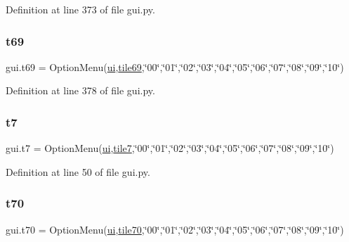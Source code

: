 Definition at line 373 of file gui.\+py.

\mbox{\label{namespacegui_ae401d95cbad2f858265141e0d3b06254}} 
\subsubsection{\texorpdfstring{t69}{t69}}
{\footnotesize\ttfamily gui.\+t69 = Option\+Menu(\mbox{\hyperlink{namespacegui_a40ab7281456eadbea2dc2038f5c24fa1}{ui}},\mbox{\hyperlink{namespacegui_a6246ec72785ce9baef112ad048f0ea64}{tile69}},\char`\"{}00\char`\"{},\char`\"{}01\char`\"{},\char`\"{}02\char`\"{},\char`\"{}03\char`\"{},\char`\"{}04\char`\"{},\char`\"{}05\char`\"{},\char`\"{}06\char`\"{},\char`\"{}07\char`\"{},\char`\"{}08\char`\"{},\char`\"{}09\char`\"{},\char`\"{}10\char`\"{})}



Definition at line 378 of file gui.\+py.

\mbox{\label{namespacegui_aca1fa54d361750111ec04ea178d10c90}} 
\subsubsection{\texorpdfstring{t7}{t7}}
{\footnotesize\ttfamily gui.\+t7 = Option\+Menu(\mbox{\hyperlink{namespacegui_a40ab7281456eadbea2dc2038f5c24fa1}{ui}},\mbox{\hyperlink{namespacegui_a70acffcd35aab2bfac1aa2340f9dab4c}{tile7}},\char`\"{}00\char`\"{},\char`\"{}01\char`\"{},\char`\"{}02\char`\"{},\char`\"{}03\char`\"{},\char`\"{}04\char`\"{},\char`\"{}05\char`\"{},\char`\"{}06\char`\"{},\char`\"{}07\char`\"{},\char`\"{}08\char`\"{},\char`\"{}09\char`\"{},\char`\"{}10\char`\"{})}



Definition at line 50 of file gui.\+py.

\mbox{\label{namespacegui_a6c75121a75ea5a0a7eb07808732d65a8}} 
\subsubsection{\texorpdfstring{t70}{t70}}
{\footnotesize\ttfamily gui.\+t70 = Option\+Menu(\mbox{\hyperlink{namespacegui_a40ab7281456eadbea2dc2038f5c24fa1}{ui}},\mbox{\hyperlink{namespacegui_a7e7a0ebb979b6a2f52ea9bf6a87066b1}{tile70}},\char`\"{}00\char`\"{},\char`\"{}01\char`\"{},\char`\"{}02\char`\"{},\char`\"{}03\char`\"{},\char`\"{}04\char`\"{},\char`\"{}05\char`\"{},\char`\"{}06\char`\"{},\char`\"{}07\char`\"{},\char`\"{}08\char`\"{},\char`\"{}09\char`\"{},\char`\"{}10\char`\"{})}



